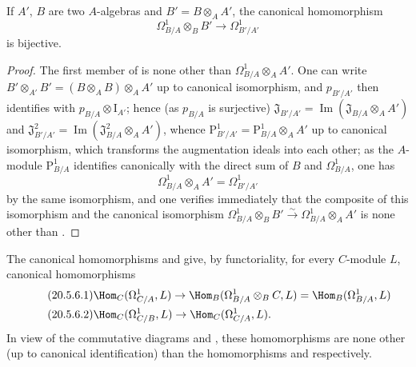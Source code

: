 \begin{proposition}[20.5.5]
\label{0.20.5.5}
If $A'$, $B$ are two $A$-algebras and $B'=B\otimes_A A'$, the canonical homomorphism 
\begin{equation}
\tag{20.5.5.1}
  \label{0.20.5.5.1}
  \Omega^1_{B/A}\otimes_B B'\to\Omega^1_{B'/A'}
\end{equation}
is bijective.
\end{proposition}

\begin{proof}
The first member of  is none other than $\Omega^1_{B/A}\otimes_A A'$.
One can write $B'\otimes_{A'}B'=(B\otimes_A B)\otimes_A A'$ up to canonical isomorphism, and $p_{B'/A'}$ then identifies with $p_{B/A}\otimes\mathrm{I}_{A'}$; hence (as $p_{B/A}$ is surjective) $\mathfrak{J}_{B'/A'}=\operatorname{Im}(\mathfrak{J}_{B/A}\otimes_A A')$ and $\mathfrak{J}^2_{B'/A'}=\operatorname{Im}(\mathfrak{J}^2_{B/A}\otimes_A A')$, whence $\mathrm{P}^1_{B'/A'}=\mathrm{P}^1_{B/A}\otimes_A A'$ up to canonical isomorphism, which transforms the augmentation ideals into each other; as the $A$-module $\mathrm{P}^1_{B/A}$ identifies canonically with the direct sum of $B$ and $\Omega^1_{B/A}$, one has
\begin{equation}
\tag{20.5.5.2}
  \label{0.20.5.5.2}
  \Omega^1_{B/A}\otimes_A A' = \Omega^1_{B'/A'}
\end{equation}
by the same isomorphism, and one verifies immediately that the composite of this isomorphism and the canonical isomorphism $\Omega^1_{B/A}\otimes_B B'\xrightarrow{\sim}\Omega^1_{B/A}\otimes_A A'$ is none other than .
\end{proof}

\begin{env}[20.5.6]
\label{0.20.5.6}
The canonical homomorphisms  and  give, by functoriality, for every $C$-module $L$, canonical homomorphisms
\begin{align}
\tag{20.5.6.1}
  \label{0.20.5.6.1}
  &\Hom_C(\Omega^1_{C/A},L)\to\Hom_B(\Omega^1_{B/A}\otimes_B C,L)=\Hom_B(\Omega^1_{B/A},L) \\
\tag{20.5.6.2}
  \label{0.20.5.6.2}
  &\Hom_C(\Omega^1_{C/B},L)\to\Hom_C(\Omega^1_{C/A},L).
\end{align}
In view of the commutative diagrams  and , these homomorphisms are none other (up to canonical identification) than the homomorphisms  and  respectively.
\end{env}

